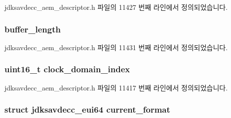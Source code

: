 jdksavdecc\+\_\+aem\+\_\+descriptor.\+h 파일의 11427 번째 라인에서 정의되었습니다.

\subsubsection[{\texorpdfstring{buffer\+\_\+length}{buffer_length}}]{ buffer\+\_\+length}\hypertarget{structjdksavdecc__descriptor__stream_add2e144e8eb02e9b6cce22e494b64db6}{}\label{structjdksavdecc__descriptor__stream_add2e144e8eb02e9b6cce22e494b64db6}


jdksavdecc\+\_\+aem\+\_\+descriptor.\+h 파일의 11431 번째 라인에서 정의되었습니다.

\subsubsection[{\texorpdfstring{clock\+\_\+domain\+\_\+index}{clock_domain_index}}]{\setlength{\rightskip}{0pt plus 5cm}uint16\+\_\+t clock\+\_\+domain\+\_\+index}\hypertarget{structjdksavdecc__descriptor__stream_a6608f023d147b556a49527d568abed8e}{}\label{structjdksavdecc__descriptor__stream_a6608f023d147b556a49527d568abed8e}


jdksavdecc\+\_\+aem\+\_\+descriptor.\+h 파일의 11417 번째 라인에서 정의되었습니다.

\subsubsection[{\texorpdfstring{current\+\_\+format}{current_format}}]{\setlength{\rightskip}{0pt plus 5cm}struct {\bf jdksavdecc\+\_\+eui64} current\+\_\+format}\hypertarget{structjdksavdecc__descriptor__stream_ae56fc78e7074485bad557163524904c7}{}\label{structjdksavdecc__descriptor__stream_ae56fc78e7074485bad557163524904c7}


